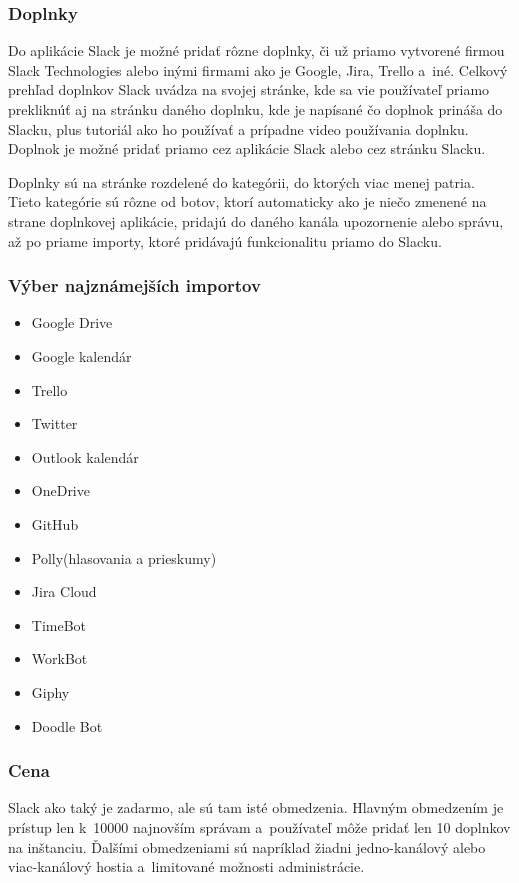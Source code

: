 \subsubsection{Doplnky}
\indent Do aplikácie Slack je možné pridať rôzne doplnky, či už priamo vytvorené firmou Slack Technologies alebo inými firmami ako je Google, Jira, Trello a iné. Celkový prehľad doplnkov Slack uvádza na svojej stránke, kde sa vie používateľ priamo prekliknúť aj na stránku daného doplnku, kde je napísané čo doplnok prináša do Slacku, plus tutoriál ako ho používať a prípadne video používania doplnku. Doplnok je možné pridať priamo cez aplikácie Slack alebo cez stránku Slacku.

\indent Doplnky sú na stránke rozdelené do kategórii, do ktorých viac menej patria. Tieto kategórie sú rôzne od botov, ktorí automaticky ako je niečo zmenené na strane doplnkovej aplikácie, pridajú do daného kanála upozornenie alebo správu, až po priame importy, ktoré pridávajú funkcionalitu priamo do Slacku.
\subsubsection{Výber najznámejších importov}
\begin{itemize}
    \item Google Drive
    \item Google kalendár
    \item Trello
    \item Twitter
    \item Outlook kalendár
    \item OneDrive
    \item GitHub
    \item Polly(hlasovania a prieskumy)
    \item Jira Cloud
    \item TimeBot
    \item WorkBot
    \item Giphy
    \item Doodle Bot
\end{itemize}
\subsubsection{Cena}
\indent Slack ako taký je zadarmo, ale sú tam isté obmedzenia. Hlavným obmedzením je prístup len k 10000 najnovším správam a používateľ môže pridať len 10 doplnkov na inštanciu. Ďalšími obmedzeniami sú napríklad žiadni jedno-kanálový alebo viac-kanálový hostia a limitované možnosti administrácie. 

